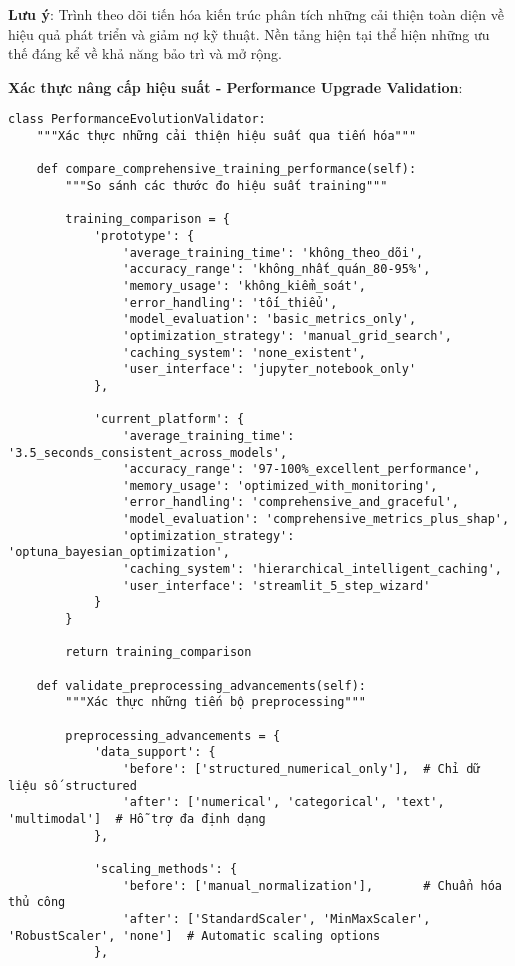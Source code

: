 \textbf{Lưu ý}: Trình theo dõi tiến hóa kiến trúc phân tích những cải thiện toàn diện về hiệu quả phát triển và giảm nợ kỹ thuật. Nền tảng hiện tại thể hiện những ưu thế đáng kể về khả năng bảo trì và mở rộng.

\textbf{Xác thực nâng cấp hiệu suất - Performance Upgrade Validation}:

\begin{verbatim}
class PerformanceEvolutionValidator:
    """Xác thực những cải thiện hiệu suất qua tiến hóa"""
    
    def compare_comprehensive_training_performance(self):
        """So sánh các thước đo hiệu suất training"""
        
        training_comparison = {
            'prototype': {
                'average_training_time': 'không_theo_dõi',
                'accuracy_range': 'không_nhất_quán_80-95%',
                'memory_usage': 'không_kiểm_soát',
                'error_handling': 'tối_thiểu',
                'model_evaluation': 'basic_metrics_only',
                'optimization_strategy': 'manual_grid_search',
                'caching_system': 'none_existent',
                'user_interface': 'jupyter_notebook_only'
            },
            
            'current_platform': {
                'average_training_time': '3.5_seconds_consistent_across_models',
                'accuracy_range': '97-100%_excellent_performance',
                'memory_usage': 'optimized_with_monitoring',
                'error_handling': 'comprehensive_and_graceful',
                'model_evaluation': 'comprehensive_metrics_plus_shap',
                'optimization_strategy': 'optuna_bayesian_optimization',
                'caching_system': 'hierarchical_intelligent_caching',
                'user_interface': 'streamlit_5_step_wizard'
            }
        }
        
        return training_comparison
    
    def validate_preprocessing_advancements(self):
        """Xác thực những tiến bộ preprocessing"""
        
        preprocessing_advancements = {
            'data_support': {
                'before': ['structured_numerical_only'],  # Chỉ dữ liệu số structured
                'after': ['numerical', 'categorical', 'text', 'multimodal']  # Hỗ trợ đa định dạng
            },
            
            'scaling_methods': {
                'before': ['manual_normalization'],       # Chuẩn hóa thủ công
                'after': ['StandardScaler', 'MinMaxScaler', 'RobustScaler', 'none']  # Automatic scaling options
            },
            

\end{verbatim}
